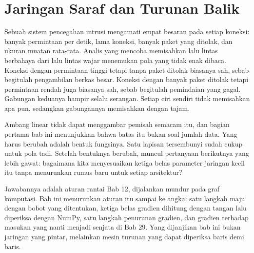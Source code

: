 \chapter{Jaringan Saraf dan Turunan Balik}

Sebuah sistem pencegahan intrusi mengamati empat besaran pada setiap koneksi: banyak
permintaan per detik, lama koneksi, banyak paket yang ditolak, dan ukuran muatan rata-rata.
Analis yang mencoba memisahkan lalu lintas berbahaya dari lalu lintas wajar menemukan pola
yang tidak enak dibaca. Koneksi dengan permintaan tinggi tetapi tanpa paket ditolak biasanya
sah, sebab begitulah pengambilan berkas besar. Koneksi dengan banyak paket ditolak tetapi
permintaan rendah juga biasanya sah, sebab begitulah pemindaian yang gagal. Gabungan
keduanya hampir selalu serangan. Setiap ciri sendiri tidak memisahkan apa pun, sedangkan
gabungannya memisahkan dengan tajam.

Ambang linear tidak dapat menggambar pemisah semacam itu, dan bagian pertama bab ini
menunjukkan bahwa batas itu bukan soal jumlah data. Yang harus berubah adalah bentuk
fungsinya. Satu lapisan tersembunyi sudah cukup untuk pola tadi. Setelah bentuknya berubah,
muncul pertanyaan berikutnya yang lebih gawat: bagaimana kita menyesuaikan ketiga belas
parameter jaringan kecil itu tanpa menurunkan rumus baru untuk setiap arsitektur?

Jawabannya adalah aturan rantai Bab 12, dijalankan mundur pada graf komputasi. Bab ini
menurunkan aturan itu sampai ke angka: satu langkah maju dengan bobot yang ditentukan,
ketiga belas gradien dihitung dengan tangan lalu diperiksa dengan NumPy, satu langkah
penurunan gradien, dan gradien terhadap masukan yang nanti menjadi senjata di Bab 29.
Yang dijanjikan bab ini bukan jaringan yang pintar, melainkan mesin turunan yang dapat
diperiksa baris demi baris.

